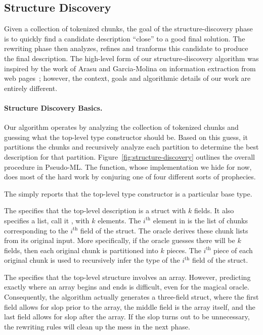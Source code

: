 \subsection {Structure Discovery}

Given a collection of tokenized chunks, the goal of the
structure-discovery phase is to quickly find a candidate description
``close'' to 
a good final solution.  The rewriting phase then analyzes, refines and
tranforms this candidate to produce the final description.
The high-level form of our structure-discovery algorithm was
inspired by the work of Arasu and 
Garcia-Molina on information extraction from web pages~\cite{arasu+:sigmod03};
however, the context, goals and algorithmic details of our
work are entirely different.


\paragraph*{Structure Discovery Basics.}
Our algorithm operates by analyzing the collection of tokenized chunks
and guessing what the top-level type constructor should be.  Based on
this guess, it partitions the chunks and recursively analyze each partition
to determine the best description for that partition.
Figure~\ref{fig:structure-discovery} outlines the
overall procedure in Pseudo-ML.  The  function,
whose implementation we hide for now, does most of the hard work by
conjuring one of four different sorts of prophecies.  

The  simply reports that the top-level type
constructor is a particular base type.

The  specifies that the top-level description is a
struct with $k$ fields.  It also
specifies a list, call it , with $k$ elements.  The
$i^{\mathrm{th}}$ element in  is the list of chunks
corresponding to the $i^{\mathrm{th}}$ field of the struct.  The
oracle derives these chunk lists from its original input. More
specifically, if the oracle guesses there will be $k$ fields, then
each original chunk is partitioned into $k$ pieces. The
$i^{\mathrm{th}}$ piece of each original chunk is used to recursively
infer the type of the $i^{\mathrm{th}}$ field of the struct.

The  specifies that the top-level structure involves
an array.  However, predicting exactly where an array begins and ends
is difficult, even for the magical oracle.  Consequently, the
algorithm actually generates a three-field struct, where the first
field allows for slop prior to the array, the middle field is the
array itself, and the last field allows for slop after the array.  If
the slop turns out to be unnecessary, the rewriting rules will clean
up the mess in the next phase.


